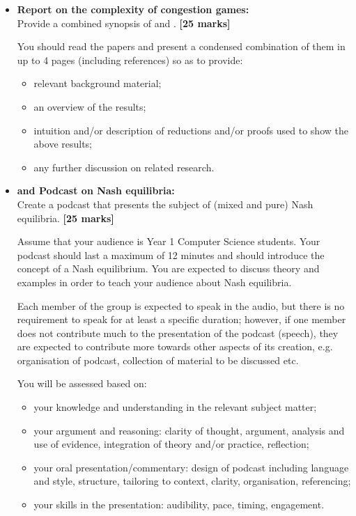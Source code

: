 \documentclass{article}
\begin{document}
\begin{itemize}
	\item \textbf{Report on the complexity of congestion games:}\\Provide a combined synopsis of \cite{FPT} and \cite{FKS}. \hfill{\bf [25 marks]}\smallskip
	
	You should read the papers and present a condensed combination of them in up to 4 pages (including references) so as to provide:
	
	\begin{itemize}
		
		\item relevant background material;
		
		\item an overview of the results;
		
		\item intuition and/or description of reductions and/or proofs used to show the above results;
		
		\item any further discussion on related research.
		
	\end{itemize}
	
	\item \textbf{and Podcast on Nash equilibria:}\\Create a podcast that presents the subject of (mixed and pure) Nash equilibria. \hfill{\bf [25 marks]}\smallskip
	
	Assume that your audience is Year 1 Computer Science students. Your podcast should last a maximum of 12 minutes and should introduce the concept of a Nash equilibrium. You are expected to discuss theory and examples in order to teach your audience about Nash equilibria.
	
	Each member of the group is expected to speak in the audio, but there is no requirement to speak for at least a specific duration; however, if one member does not contribute much to the presentation of the podcast (speech), they are expected to contribute more towards other aspects of its creation, e.g. organisation of podcast, collection of material to be discussed etc.
	
	You will be assessed based on:
	
	\begin{itemize}
		\item your knowledge and understanding in the relevant subject matter;
		\item your argument and reasoning: 	clarity of thought, argument, analysis and use of evidence, integration of theory and/or practice, reflection;
		\item your oral presentation/commentary: design of podcast including language and style, structure, tailoring to context, clarity, organisation, referencing;
		\item your skills in the presentation: audibility, pace, timing, engagement.
	\end{itemize}
\end{itemize}
\end{document}
